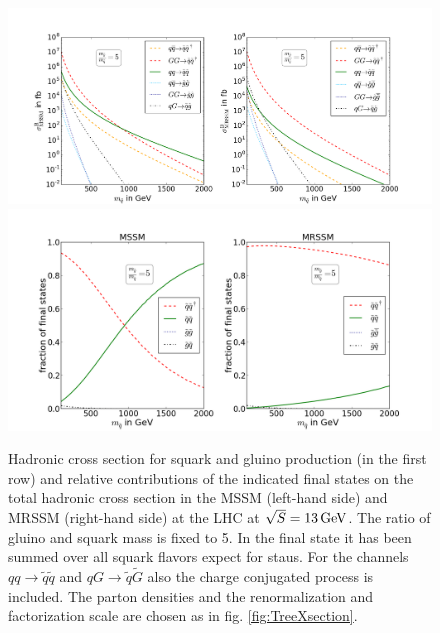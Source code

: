 \begin{figure}[!htpb]
\begin{center}
\includegraphics[scale=.4]{figures/mr=5_MSSM+MRSSM}
\includegraphics[scale=.45]{figures/rel_weights_mr=5_MSSM+MRSSM}
\caption{Hadronic cross section for squark and gluino production (in the first row) and relative contributions of the indicated final states on the total hadronic cross section in the MSSM (left-hand side) and MRSSM (right-hand side) at the LHC at $\sqrt{S} = \unit[13]{GeV}$. The ratio of gluino and squark mass is fixed to 5. In the final state it has been summed over all squark flavors expect for staus. For the channels $qq \to \tilde{q}\tilde{q}$ and $qG \to \tilde{q}\tilde{G}$ also the charge conjugated process is included. The parton densities and the renormalization and factorization scale are chosen as in fig. \ref{fig:TreeXsection}.}\label{fig:TreeXsection5}
\end{center}
\end{figure}


